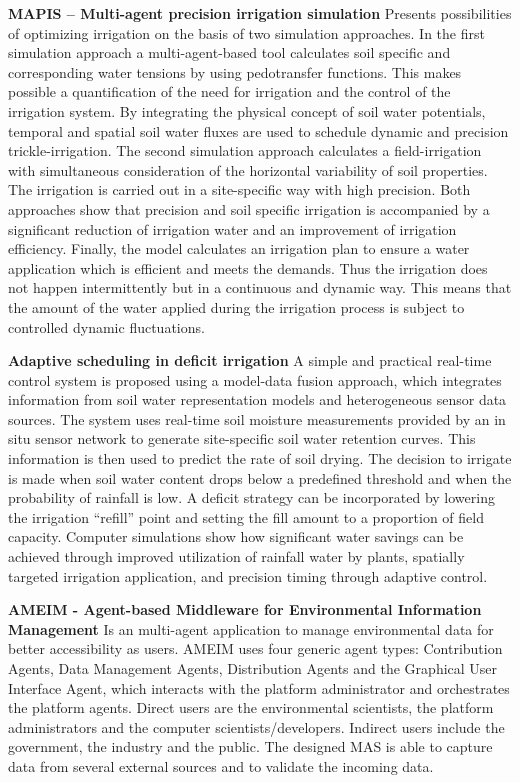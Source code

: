 \documentclass[letterpaper, 10 pt, conference]{ieeeconf}  %
\begin{document}
\textbf{MAPIS – Multi-agent  precision  irrigation simulation} \cite{Grashey-Jansen2014} Presents possibilities of optimizing irrigation on the basis of two simulation approaches. In the first simulation approach a multi-agent-based tool calculates soil specific and corresponding water tensions by using pedotransfer functions. This makes possible a quantification of the need for irrigation and the control of the irrigation system. By integrating the physical concept of soil water potentials, temporal and spatial soil water fluxes are used to schedule dynamic and precision trickle-irrigation. The second simulation approach calculates a field-irrigation with simultaneous consideration of the horizontal variability of soil properties. The irrigation is carried out in a site-specific way with high precision. Both approaches show that precision and soil specific irrigation is accompanied by a significant reduction of irrigation water and an improvement of irrigation efficiency. Finally, the model calculates an irrigation plan to ensure a water application which is efficient and meets the demands. Thus the irrigation does not happen intermittently but in a continuous and dynamic way. This means that the amount of the water applied during the irrigation process is subject to controlled dynamic fluctuations.


\textbf{Adaptive scheduling in deficit irrigation} \cite{holloway2008adaptive} A simple and practical real-time control system is proposed  using  a  model-data  fusion  approach,  which  integrates  information  from  soil  water representation models and heterogeneous sensor data sources.  The system  uses real-time soil moisture measurements provided by an in situ sensor network to generate site-specific soil water retention curves. This information is then used  to predict the rate of soil drying. The decision to irrigate is made when soil water  content drops below a predefined threshold and when the probability of rainfall  is low. A deficit strategy can be incorporated by lowering the irrigation “refill” point  and  setting  the  fill  amount  to  a  proportion  of  field  capacity.  Computer  simulations  show  how  significant  water  savings  can  be  achieved  through improved  utilization  of  rainfall  water  by  plants,  spatially  targeted  irrigation  application, and precision timing through adaptive control.  

\textbf{AMEIM - Agent-based  Middleware  for  Environmental  Information Management} \cite{Athanasiadis2005} Is an  multi-agent application to manage environmental data for better accessibility as users. AMEIM uses four generic agent types: Contribution Agents, Data Management Agents, Distribution Agents and the Graphical User Interface Agent, which interacts with the platform administrator and orchestrates the platform agents. Direct users are the environmental scientists, the platform administrators and the computer scientists/developers. Indirect users include the government, the industry and the public. The designed MAS is able to capture data from several external sources and to validate the incoming data.
\end{document}
